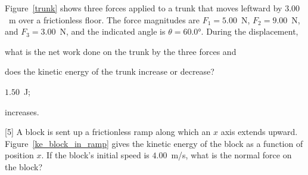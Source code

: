 \begin{problem}\label{prb:trunk}
		Figure~\ref{trunk} shows three forces applied to a trunk that moves leftward by $3.00$~m over a frictionless floor. The force magnitudes are $F_1 = 5.00$~N, $F_2 = 9.00$~N, and $F_3 = 3.00$~N, and the indicated angle is $\theta = \ang{60.0}$. During the displacement, 
	\begin{enumerate*}[label=(\alph*)]
		\item what is the net work done on the trunk by the three forces and
		\item does the kinetic energy of the trunk increase or decrease?
	\end{enumerate*}
	\begin{solution}
		\begin{enumerate*}[label=(\alph*)]
			\item $1.50$~J;
			\item increases.
		\end{enumerate*}
	\end{solution}
\end{problem}


\begin{problem}\label{prb:ke_block_in_ramp}%
	\correct{5.5cm}[5]%
	A block is sent up a frictionless ramp along which an $x$ axis extends upward. Figure~\ref{ke_block_in_ramp} gives the kinetic energy of the block as a function of position $x$. If the block's initial speed is $4.00$~m/s, what is the normal force on the block?
\end{problem}


